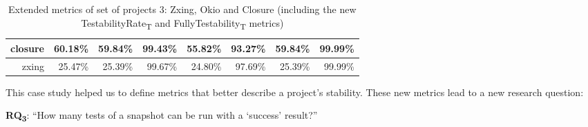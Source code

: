 \begin{table}[h!]
\begin{tabular}{|r|r|r|r|r|r|r|r|}
        closure                                & 60.18\%                                                                                        & 59.84\%                                                                                       & 99.43\%                                                                                       & 55.82\%                                                                                      & 93.27\%                                                                                      & 59.84\%                                                                                     & 99.99\%                                                                                     \\ \hline
        zxing                                  & 25.47\%                                                                                        & 25.39\%                                                                                       & 99.67\%                                                                                       & 24.80\%                                                                                      & 97.69\%                                                                                      & 25.39\%                                                                                     & 99.99\%                                                                                    \\ \hline
    \end{tabular}
    \caption{Extended metrics of set of projects 3: Zxing, Okio and Closure (including the new TestabilityRate\textsubscript{T} and FullyTestability\textsubscript{T} metrics)}
    \label{table:projects-3-with-flavor-testability-rate}
\end{table}


\def \RQIII{How many tests of a snapshot can be run with a `success' result?}

This case study helped us to define metrics that better describe a project's stability. These new metrics lead to a new research question: 

\textbf{RQ\textsubscript{3}}: ``\RQIII''
